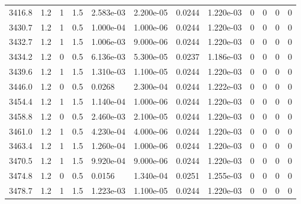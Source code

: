 \documentclass[preview]{standalone}
\begin{document}
{{{{{{{{{{{{{{{{{{{\begin{tabular}{L{1.2cm}C{1.2cm} C{0.3cm}C{0.5cm} C{1.4cm}C{1.4cm} C{1.4cm}C{1.4cm} C{1.6cm}C{1.6cm} C{1.6cm}C{1.6cm}}
  3416.8  &   1.2  & 1     & 1.5 &  2.583e-03  & 2.200e-05  &  0.0244&   1.220e-03& 0 & 0   &  0 & 0  \\ 
  3430.7  &   1.2  & 1     & 0.5 &  1.000e-04  & 1.000e-06  &  0.0244&   1.220e-03& 0 & 0   &  0 & 0  \\ 
  3432.7  &   1.2  & 1     & 1.5 &  1.006e-03  & 9.000e-06  &  0.0244&   1.220e-03& 0 & 0   &  0 & 0  \\ 
  3434.2  &   1.2  & 0     & 0.5 &  6.136e-03  & 5.300e-05  &  0.0237&   1.186e-03& 0 & 0   &  0 & 0  \\ 
  3439.6  &   1.2  & 1     & 1.5 &  1.310e-03  & 1.100e-05  &  0.0244&   1.220e-03& 0 & 0   &  0 & 0  \\ 
  3446.0  &   1.2  & 0     & 0.5 &  0.0268  & 2.300e-04  &  0.0244&   1.222e-03& 0 & 0   &  0 & 0  \\ 
  3454.4  &   1.2  & 1     & 1.5 &  1.140e-04  & 1.000e-06  &  0.0244&   1.220e-03& 0 & 0   &  0 & 0  \\ 
  3458.8  &   1.2  & 0     & 0.5 &  2.460e-03  & 2.100e-05  &  0.0244&   1.220e-03& 0 & 0   &  0 & 0  \\ 
  3461.0  &   1.2  & 1     & 0.5 &  4.230e-04  & 4.000e-06  &  0.0244&   1.220e-03& 0 & 0   &  0 & 0  \\ 
  3463.4  &   1.2  & 1     & 1.5 &  1.260e-04  & 1.000e-06  &  0.0244&   1.220e-03& 0 & 0   &  0 & 0  \\ 
  3470.5  &   1.2  & 1     & 1.5 &  9.920e-04  & 9.000e-06  &  0.0244&   1.220e-03& 0 & 0   &  0 & 0  \\ 
  3474.8  &   1.2  & 0     & 0.5 &  0.0156  & 1.340e-04  &  0.0251&   1.255e-03& 0 & 0   &  0 & 0  \\ 
  3478.7  &   1.2  & 1     & 1.5 &  1.223e-03  & 1.100e-05  &  0.0244&   1.220e-03& 0 & 0   &  0 & 0  \\ 
\hline 
\end{tabular} 

}}}}}}}}}}}}}}}}}}}
\end{document}
